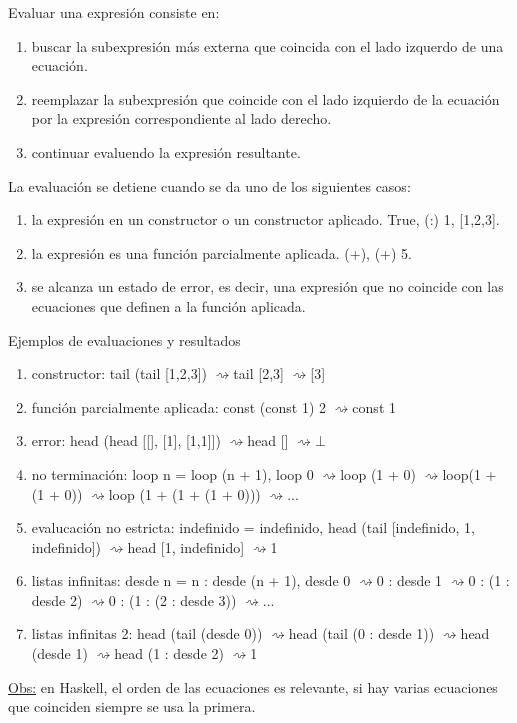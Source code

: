 \documentclass[12pt]{extarticle}
\def\observacion{\underline{Obs:} }
\def\eval{$\rightsquigarrow$}
\begin{document}
Evaluar una expresión consiste en:
\begin{enumerate}
\itemsep-0.35em 
\item buscar la subexpresión más externa que coincida con el lado izquerdo de una ecuación.
\item reemplazar la subexpresión que coincide con el lado izquierdo de la ecuación por la expresión correspondiente al lado derecho.
\item continuar evaluendo la expresión resultante.
\end{enumerate}

La evaluación se detiene cuando se da uno de los siguientes casos:
\begin{enumerate}
\itemsep-0.35em 
\item la expresión en un constructor o un constructor aplicado. True, (:) 1, [1,2,3].
\item la expresión es una función parcialmente aplicada. (+), (+) 5.
\item se alcanza un estado de error, es decir, una expresión que no coincide con las ecuaciones que definen a la función aplicada.
\end{enumerate}

Ejemplos de evaluaciones y resultados
\begin{enumerate}
\itemsep-0.35em 
\item constructor: tail (tail [1,2,3]) \eval tail [2,3] \eval [3]
\item función parcialmente aplicada: const (const 1) 2 \eval const 1
\item error: head (head [[], [1], [1,1]]) \eval head [] \eval $\bot$
\item no terminación: loop n = loop (n + 1), loop 0 \eval loop (1 + 0) \eval loop(1 + (1 + 0)) \eval loop (1 + (1 + (1 + 0))) \eval ...
\item evalucación no estricta: indefinido = indefinido, head (tail [indefinido, 1, indefinido]) \eval head [1, indefinido] \eval 1
\item listas infinitas: desde n = n : desde (n + 1), desde 0 \eval 0 : desde 1 \eval 0 : (1 : desde 2) \eval 0 : (1 : (2 : desde 3)) \eval ...
\item listas infinitas 2: head (tail (desde 0)) \eval head (tail (0 : desde 1)) \eval head (desde 1) \eval head (1 : desde 2) \eval 1
\end{enumerate}

\observacion en Haskell, el orden de las ecuaciones es relevante, si hay varias ecuaciones que coinciden siempre se usa la primera.
\end{document}
